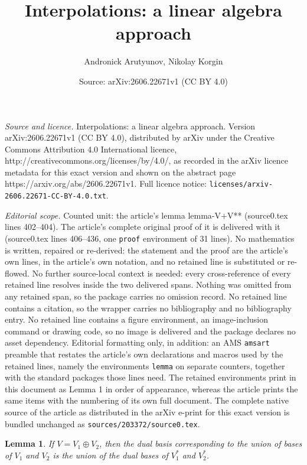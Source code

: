 \documentclass[10pt,a4paper]{amsart}
\title{Interpolations: a linear algebra approach}
\author{Andronick Arutyunov, Nikolay Korgin}
\date{Source: arXiv:2606.22671v1 (CC BY 4.0)}
\newtheorem{lemma}{Lemma}
\begin{document}
\maketitle

\noindent\emph{Source and licence.} Interpolations: a linear algebra approach. Version arXiv:2606.22671v1 (CC BY 4.0), distributed by arXiv under the Creative Commons Attribution 4.0 International licence, http://creativecommons.org/licenses/by/4.0/, as recorded in the arXiv licence metadata for this exact version and shown on the abstract page https://arxiv.org/abs/2606.22671v1. Full licence notice: \texttt{licenses/arxiv-2606.22671-CC-BY-4.0.txt}.\par\smallskip

\noindent\textit{Editorial scope.} Counted unit: the article's lemma lemma-V+V** (source0.tex lines 402--404). The article's complete original proof of it is delivered with it (source0.tex lines 406--436, one \texttt{proof} environment of 31 lines). No mathematics is written, repaired or re-derived: the statement and the proof are the article's own lines, in the article's own notation, and no retained line is substituted or re-flowed.  No further source-local context is needed: every cross-reference of every retained line resolves inside the two delivered spans.  Nothing was omitted from any retained span, so the package carries no omission record.  No retained line contains a citation, so the wrapper carries no bibliography and no bibliography entry.  No retained line contains a figure environment, an image-inclusion command or drawing code, so no image is delivered and the package declares no asset dependency.  Editorial formatting only, in addition: an AMS \texttt{amsart} preamble that restates the article's own declarations and macros used by the retained lines, namely the environments \texttt{lemma} on separate counters, together with the standard packages those lines need.  The retained environments print in this document as Lemma 1 in order of appearance, whereas the article prints the same items with the numbering of its own full document.  The complete native source of the article as distributed in the arXiv e-print for this exact version is bundled unchanged as \texttt{sources/203372/source0.tex}.
\begin{lemma}\label{lemma-V+V**}
If $V = V_1 \oplus V_2$, then the dual basis corresponding to the union of bases of $V_1$ and $V_2$ is the union of the dual bases of $V_1^*$ and $V_2^*$.
\end{lemma}
\end{document}
